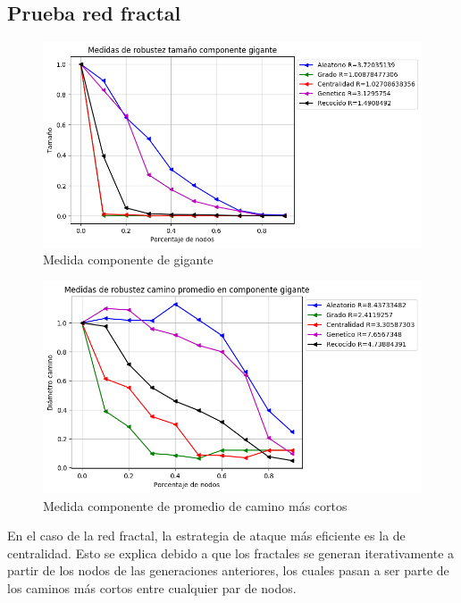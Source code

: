 \subsection{Prueba red fractal}

\begin{figure}[H]
    \centering
    \includegraphics[scale=0.7]{Capitulo5Robustez/imagenes/grafica_GC20180501_151350floweru1v3.png}
    \caption{Medida componente de gigante}
\end{figure}


\begin{figure}[H]
    \centering
    \includegraphics[scale=0.7]{Capitulo5Robustez/imagenes/grafica_APL20180501_151350floweru1v3.png}
    \caption{Medida componente de promedio de camino más cortos}
\end{figure}

En el caso de la red fractal, la estrategia de ataque más eficiente es la de centralidad. Esto se explica debido a que los fractales se generan iterativamente a partir de los nodos de las generaciones anteriores, los cuales pasan a ser parte de los caminos más cortos entre cualquier par de nodos.